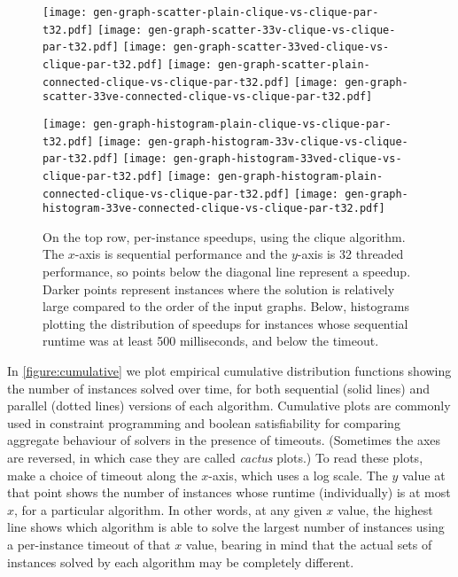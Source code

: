 \documentclass[sigconf]{acmart}
\begin{document}
\begin{figure*}[p]
    \texttt{[image: gen-graph-scatter-plain-clique-vs-clique-par-t32.pdf]}
    \hfill
    \texttt{[image: gen-graph-scatter-33v-clique-vs-clique-par-t32.pdf]}
    \hfill
    \texttt{[image: gen-graph-scatter-33ved-clique-vs-clique-par-t32.pdf]}
    \hfill
    \texttt{[image: gen-graph-scatter-plain-connected-clique-vs-clique-par-t32.pdf]}
    \hfill
    \texttt{[image: gen-graph-scatter-33ve-connected-clique-vs-clique-par-t32.pdf]}

    \vspace*{1em}

    \texttt{[image: gen-graph-histogram-plain-clique-vs-clique-par-t32.pdf]}
    \hfill
    \texttt{[image: gen-graph-histogram-33v-clique-vs-clique-par-t32.pdf]}
    \hfill
    \texttt{[image: gen-graph-histogram-33ved-clique-vs-clique-par-t32.pdf]}
    \hfill
    \texttt{[image: gen-graph-histogram-plain-connected-clique-vs-clique-par-t32.pdf]}
    \hfill
    \texttt{[image: gen-graph-histogram-33ve-connected-clique-vs-clique-par-t32.pdf]}

    \caption{On the top row, per-instance speedups, using the clique algorithm. The $x$-axis is
    sequential performance and the $y$-axis is 32 threaded performance, so points below the diagonal
    line represent a speedup. Darker points represent instances where the solution is relatively
    large compared to the order of the input graphs. Below, histograms plotting the distribution of
    speedups for instances whose sequential runtime was at least 500 milliseconds, and below the
    timeout.}\label{figure:cliquespeedups}
\end{figure*}

In \cref{figure:cumulative} we plot empirical cumulative distribution functions showing the number
of instances solved over time, for both sequential (solid lines) and parallel (dotted lines)
versions of each algorithm.  Cumulative plots are commonly used in constraint programming and
boolean satisfiability for comparing aggregate behaviour of solvers in the presence of timeouts.
(Sometimes the axes are reversed, in which case they are called \emph{cactus} plots.)  To read these
plots, make a choice of timeout along the $x$-axis, which uses a log scale. The $y$ value at that
point shows the number of instances whose runtime (individually) is at most $x$, for a particular
algorithm. In other words, at any given $x$ value, the highest line shows which algorithm is able to
solve the largest number of instances using a per-instance timeout of that $x$ value, bearing in
mind that the actual sets of instances solved by each algorithm may be completely different.
\end{document}
